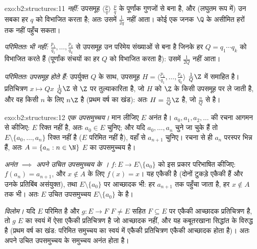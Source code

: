 \begin{solution}{exo:b2:structures:11}
\emph{ नहीं:} उपसमूह $\langle \frac pq\rangle$ $\frac pq$ के पूर्णांक गुणजों से बना है, और
(लघुतम रूप में) उन सबका हर $q$ को विभाजित करता है; अतः उसमें $\frac{1}{2q}$ नहीं
आता। कोई एक जनक $\Q$ के असीमित हरों तक नहीं पहुँच सकता।

\emph{परिमिततः  भी नहीं:} $\frac{p_1}{q_1}, \dots, \frac{p_k}{q_k}$ से  उपसमूह उन परिमेय संख्याओं
से बना है जिनके हर $Q = q_1 \cdots q_k$ को विभाजित करते हैं (पूर्णांक संचयों का हर $Q$
को विभाजित करता है): उसमें $\frac{1}{2Q}$ नहीं आता।

\emph{परिमिततः  उपसमूह  होते हैं:} उपर्युक्त $Q$ के साथ,
उपसमूह $H = \langle \frac{p_1}{q_1}, \dots,
\frac{p_k}{q_k}\rangle$ $\frac{1}{Q}\Z$ में समाहित है। प्रतिचित्रण $x
\mapsto Qx$ $\frac1Q\Z$ से $\Z$ पर
तुल्याकारिता है, जो $H$ को $\Z$ के किसी उपसमूह पर ले जाती है, और वह
किसी $n$ के लिए $n\Z$ है (प्रथम वर्ष का खंड): अतः $H = \frac{n}{Q}\Z$  है, जो
$\frac nQ$ से  है।
\end{solution}

\begin{solution}{exo:b2:structures:12}
\emph{एक  उपसमुच्चय।} मान लीजिए $E$ अनंत है। $a_0,
a_1, a_2, \dots$ की रचना आगमन से
कीजिए: $E$ रिक्त नहीं है, अतः $a_0 \in E$ चुनिए; और यदि $a_0, \dots, a_n$ चुने जा चुके हैं
तो $E \setminus \{a_0, \dots,
a_n\}$ रिक्त नहीं है ($E$ परिमित नहीं है), वहाँ से $a_{n+1}$ चुनिए। रचना से
ही $a_n$ परस्पर भिन्न हैं, अतः $A = \{a_n : n
\in \N\}$ $E$ का  उपसमुच्चय है।

\emph{अनंत $\implies$ अपने उचित उपसमुच्चय के ।} $f \colon E \to E \setminus \{a_0\}$ को इस प्रकार
परिभाषित कीजिए: $f(a_n) = a_{n+1}$, और $x \notin A$ के लिए $f(x) = x$। यह एकैकी है (दोनों टुकड़े
एकैकी हैं और उनके प्रतिबिंब असंयुक्त), तथा $E \setminus
\{a_0\}$ पर आच्छादक भी: हर $a_{n+1}$
तक पहुँचा जाता है, हर $x \notin A$ तक भी। अतः $E$ उचित उपसमुच्चय $E \setminus \{a_0\}$ के 
है।

\emph{विलोम।} यदि $E$ परिमित है और $g \colon E \to F$ $F \neq E$ सहित $F \subseteq E$ पर एकैकी आच्छादक
प्रतिचित्रण है, तो $g$ $E$ का स्वयं में ऐसा एकैकी प्रतिचित्रण है जो
आच्छादक नहीं, और यह कबूतरखाना सिद्धांत के विरुद्ध है (प्रथम वर्ष का
खंड: परिमित समुच्चय का स्वयं में एकैकी प्रतिचित्रण एकैकी आच्छादक होता
है)। अतः अपने उचित उपसमुच्चय के  समुच्चय अनंत होता है।
\end{solution}

